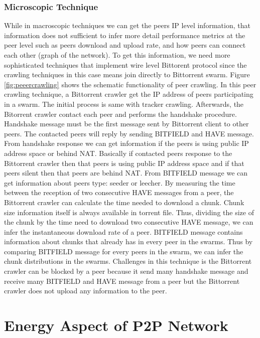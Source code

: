\subsubsection{Microscopic Technique}
While in macroscopic techniques we can get the peers IP level information, that information does not sufficient to infer more detail performance metrics at the peer level such as peers download and upload rate, and how peers can connect each other (graph of the network).
To get this information, we need more sophisticated techniques that implement wire level Bittorent protocol since the crawling techniques in this case means join directly to Bittorrent swarm.
Figure \ref{fig:peeercrawling} shows the schematic functionality of peer crawling.  
In this peer crawling technique, a Bittorrent crawler get the IP address of peers participating in a swarm.
The initial process is same with tracker crawling. 
Afterwards, the Bitorrent crawler contact each peer and performs the handshake procedure. 
Handshake message must be the first message sent by Bittorrent client to other peers.
The contacted peers will reply by sending BITFIELD and HAVE message.
From handshake response we can get information if the peers is using public IP address space or behind NAT. 
Basically if contacted peers response to the Bittorrent crawler then that peers is using public IP address space and if that peers silent then that peers are behind NAT.
From BITFIELD message we can get information about peers type: seeder or leecher.   
By measuring the time between the reception of two consecutive HAVE messages from a peer, the Bittorrent crawler can calculate the time needed to download a chunk.
Chunk size information itself is always available in torrent file.
Thus, dividing the size of the chunk by the time need to download two consecutive HAVE message, we can infer the instantaneous download rate of a peer.
BITFIELD message contains information about chunks that already has in every peer in the swarms.  
Thus by comparing BITFIELD message for every peers in the swarm,  we can infer the chunk distributions in the swarms.
Challenges in this technique is the Bittorrent crawler can be blocked by a peer because it send many handshake message and receive many BITFIELD and HAVE message from a peer but the Bittorrent crawler does not upload any information to the peer.


\section{Energy Aspect of P2P Network}


